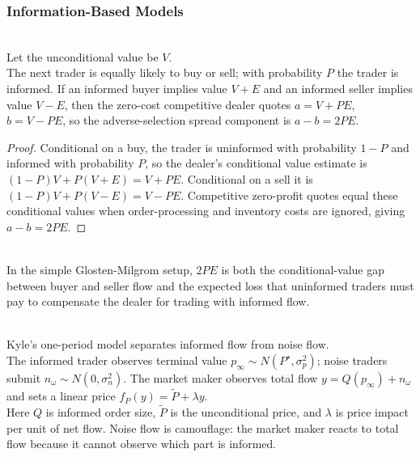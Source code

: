 \subsubsection{Information-Based Models}

\begin{proposition} \\
Let the unconditional value be $V$.\\
The next trader is equally likely to buy or sell; with probability $P$ the trader is informed. If an informed buyer implies value $V+E$ and an informed seller implies value $V-E$, then the zero-cost competitive dealer quotes $a=V+PE$, $b=V-PE$, so the adverse-selection spread component is $a-b=2PE$.
\begin{proof}
Conditional on a buy, the trader is uninformed with probability $1-P$ and informed with probability $P$, so the dealer's conditional value estimate is $(1-P)V+P(V+E)=V+PE$. Conditional on a sell it is $(1-P)V+P(V-E)=V-PE$. Competitive zero-profit quotes equal these conditional values when order-processing and inventory costs are ignored, giving $a-b=2PE$.
\end{proof}
\end{proposition}

\begin{principle} \\
In the simple Glosten-Milgrom setup, $2PE$ is both the conditional-value gap between buyer and seller flow and the expected loss that uninformed traders must pay to compensate the dealer for trading with informed flow.
\end{principle}

\begin{model} \\
Kyle's one-period model separates informed flow from noise flow.\\
The informed trader observes terminal value $p_\infty\sim N(P^\star,\sigma_p^2)$; noise traders submit $n_\omega\sim N(0,\sigma_n^2)$. The market maker observes total flow $y=Q(p_\infty)+n_\omega$ and sets a linear price $f_P(y)=\tilde{P}+\lambda y$.\\
Here $Q$ is informed order size, $\tilde{P}$ is the unconditional price, and $\lambda$ is price impact per unit of net flow. Noise flow is camouflage: the market maker reacts to total flow because it cannot observe which part is informed.
\end{model}


